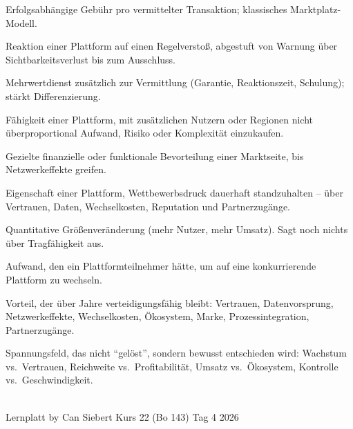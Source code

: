 \documentclass[11pt,a4paper,oneside]{article}
\begin{document}
\begin{description}[style=nextline,leftmargin=0pt,labelindent=0pt,itemsep=4pt]
  \item[Provision] Erfolgsabhängige Gebühr pro vermittelter Transaktion; klassisches Marktplatz-Modell.
  \item[Sanktion] Reaktion einer Plattform auf einen Regelverstoß, abgestuft von Warnung über Sichtbarkeitsverlust bis zum Ausschluss.
  \item[Servicepaket] Mehrwertdienst zusätzlich zur Vermittlung (Garantie, Reaktionszeit, Schulung); stärkt Differenzierung.
  \item[Skalierung] Fähigkeit einer Plattform, mit zusätzlichen Nutzern oder Regionen nicht überproportional Aufwand, Risiko oder Komplexität einzukaufen.
  \item[Subventionierung] Gezielte finanzielle oder funktionale Bevorteilung einer Marktseite, bis Netzwerkeffekte greifen.
  \item[Verteidigungsfähigkeit] Eigenschaft einer Plattform, Wettbewerbsdruck dauerhaft standzuhalten -- über Vertrauen, Daten, Wechselkosten, Reputation und Partnerzugänge.
  \item[Wachstum] Quantitative Größenveränderung (mehr Nutzer, mehr Umsatz). Sagt noch nichts über Tragfähigkeit aus.
  \item[Wechselkosten] Aufwand, den ein Plattformteilnehmer hätte, um auf eine konkurrierende Plattform zu wechseln.
  \item[Wettbewerbsvorteil (nachhaltig)] Vorteil, der über Jahre verteidigungsfähig bleibt: Vertrauen, Datenvorsprung, Netzwerkeffekte, Wechselkosten, Ökosystem, Marke, Prozessintegration, Partnerzugänge.
  \item[Zielkonflikt] Spannungsfeld, das nicht ``gelöst'', sondern bewusst entschieden wird: Wachstum vs.\ Vertrauen, Reichweite vs.\ Profitabilität, Umsatz vs.\ Ökosystem, Kontrolle vs.\ Geschwindigkeit.
\end{description}

\vspace{1cm}
\noindent{\color{lpAccent}\rule{\linewidth}{0.6pt}}\\[4pt]
{\footnotesize\sffamily\color{lpGray}Lernplatt \textperiodcentered{} by Can Siebert \textperiodcentered{} Kurs 22 (Bo 143) \textperiodcentered{} Tag 4 \textperiodcentered{} \textcopyright{} 2026}
\end{document}
